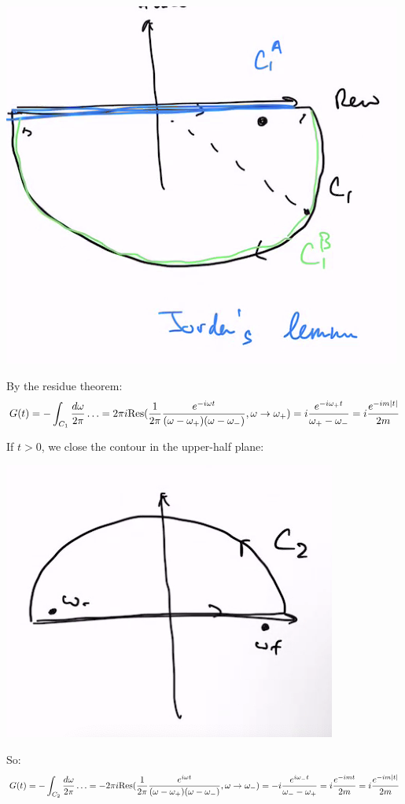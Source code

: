 \begin{center}
    \includegraphics[scale=0.8]{Lectures/Figures/lowerhalfcontour.png}
\end{center}

By the residue theorem:
\begin{equation}
    G(t) = -\int_{C_1}\frac{d\omega}{2\pi}\ldots = 2\pi i \text{Res}(\frac{1}{2\pi}\frac{e^{-i\omega t}}{(\omega - \omega_+)(\omega - \omega_-)}, \omega \to \omega_+) = i\frac{e^{-i\omega_+ t}}{\omega_+ - \omega_-} = i\frac{e^{-im\lvert t \rvert}}{2m}
\end{equation}

If $t > 0$, we close the contour in the upper-half plane:
\begin{center}
    \includegraphics[scale=0.8]{Lectures/Figures/upperhalfcontour.png}
\end{center}
So:
\begin{equation}
    G(t) = -\int_{C_2}\frac{d\omega}{2\pi}\ldots = -2\pi i \text{Res}(\frac{1}{2\pi}\frac{e^{i\omega t}}{(\omega - \omega_+)(\omega - \omega_-)}, \omega \to \omega_-) = -i\frac{e^{i\omega_-t}}{\omega_- - \omega_+} = i\frac{e^{-imt}}{2m} = i\frac{e^{-im\lvert t \rvert}}{2m}
\end{equation}

